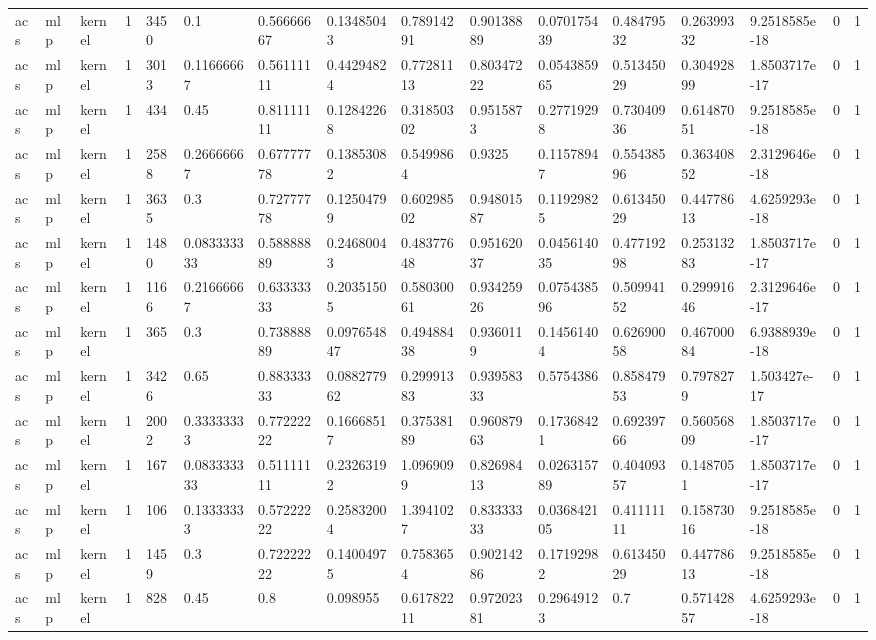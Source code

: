 \begin{tabular}{llllllllllllllll}
acs & mlp & kernel & 1 & 3450 & 0.1 & 0.56666667 & 0.13485043 & 0.78914291 & 0.90138889 & 0.070175439 & 0.48479532 & 0.26399332 & 9.2518585e-18 & 0 & 1 \\
acs & mlp & kernel & 1 & 3013 & 0.11666667 & 0.56111111 & 0.44294824 & 0.77281113 & 0.80347222 & 0.054385965 & 0.51345029 & 0.30492899 & 1.8503717e-17 & 0 & 1 \\
acs & mlp & kernel & 1 & 434 & 0.45 & 0.81111111 & 0.12842268 & 0.31850302 & 0.9515873 & 0.27719298 & 0.73040936 & 0.61487051 & 9.2518585e-18 & 0 & 1 \\
acs & mlp & kernel & 1 & 2588 & 0.26666667 & 0.67777778 & 0.13853082 & 0.5499864 & 0.9325 & 0.11578947 & 0.55438596 & 0.36340852 & 2.3129646e-18 & 0 & 1 \\
acs & mlp & kernel & 1 & 3635 & 0.3 & 0.72777778 & 0.12504799 & 0.60298502 & 0.94801587 & 0.11929825 & 0.61345029 & 0.44778613 & 4.6259293e-18 & 0 & 1 \\
acs & mlp & kernel & 1 & 1480 & 0.083333333 & 0.58888889 & 0.24680043 & 0.48377648 & 0.95162037 & 0.045614035 & 0.47719298 & 0.25313283 & 1.8503717e-17 & 0 & 1 \\
acs & mlp & kernel & 1 & 1166 & 0.21666667 & 0.63333333 & 0.20351505 & 0.58030061 & 0.93425926 & 0.075438596 & 0.50994152 & 0.29991646 & 2.3129646e-17 & 0 & 1 \\
acs & mlp & kernel & 1 & 365 & 0.3 & 0.73888889 & 0.097654847 & 0.49488438 & 0.9360119 & 0.14561404 & 0.62690058 & 0.46700084 & 6.9388939e-18 & 0 & 1 \\
acs & mlp & kernel & 1 & 3426 & 0.65 & 0.88333333 & 0.088277962 & 0.29991383 & 0.93958333 & 0.5754386 & 0.85847953 & 0.7978279 & 1.503427e-17 & 0 & 1 \\
acs & mlp & kernel & 1 & 2002 & 0.33333333 & 0.77222222 & 0.16668517 & 0.37538189 & 0.96087963 & 0.17368421 & 0.69239766 & 0.56056809 & 1.8503717e-17 & 0 & 1 \\
acs & mlp & kernel & 1 & 167 & 0.083333333 & 0.51111111 & 0.23263192 & 1.0969099 & 0.82698413 & 0.026315789 & 0.40409357 & 0.1487051 & 1.8503717e-17 & 0 & 1 \\
acs & mlp & kernel & 1 & 106 & 0.13333333 & 0.57222222 & 0.25832004 & 1.3941027 & 0.83333333 & 0.036842105 & 0.41111111 & 0.15873016 & 9.2518585e-18 & 0 & 1 \\
acs & mlp & kernel & 1 & 1459 & 0.3 & 0.72222222 & 0.14004975 & 0.7583654 & 0.90214286 & 0.17192982 & 0.61345029 & 0.44778613 & 9.2518585e-18 & 0 & 1 \\
acs & mlp & kernel & 1 & 828 & 0.45 & 0.8 & 0.098955 & 0.61782211 & 0.97202381 & 0.29649123 & 0.7 & 0.57142857 & 4.6259293e-18 & 0 & 1 \\

\end{tabular}
